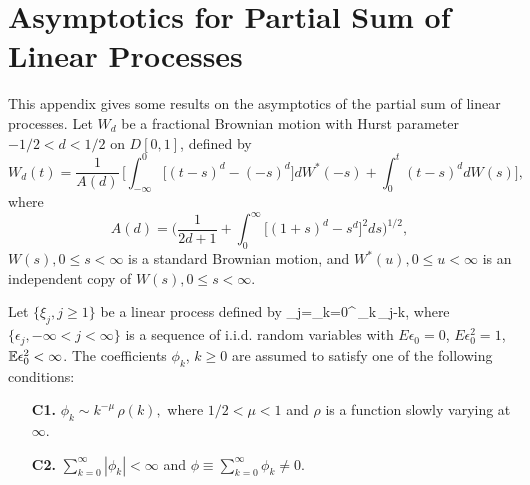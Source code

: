 \chapter{Asymptotics for Partial Sum of Linear Processes} 

This appendix gives some results on the asymptotics of the partial sum of linear processes. Let $W_{d }$  be a fractional Brownian motion with Hurst parameter $-1/2<d<1/2$ on $D[0,1]$, defined by
\begin{equation*}
W_{d}(t)=\frac{1}{A(d)}\,\big[ \int_{-\infty }^{0}\Big[(t-s)^{d}-(-s)^{d}\Big]dW^*(-s)+\int_{0}^{t}(t-s)^{d}dW(s)\big],
\end{equation*}%
where
\begin{equation*}
A(d)=\Big (\frac{1}{2d+1 }+\int_{0}^{\infty }\Big[(1+s)^{d}-s^{d}\Big]^{2}ds\Big)^{1/2},
\end{equation*}%
$W(s), 0\leq s<\infty $ is a standard Brownian motion, and
$W^{\ast }(u),0\leq u<\infty $ is an independent copy of $W(s), 0\leq s<\infty $.

Let $\{\xi_{j},j\geq 1\}$ be a linear process defined by
\bestar
\xi _{j}=\sum_{k=0}^{\infty }\,\phi _{k}\,\epsilon _{j-k},
\eestar
where $\{\epsilon _{j},-\infty <j<\infty \}$ is a sequence of i.i.d. random variables with $E\epsilon _{0}=0$, $E\epsilon _{0}^{2}=1$, $\mathbb E\epsilon_0^2 < \infty$. The coefficients $\phi_k$, $k \ge 0$ are assumed to satisfy one of the following conditions:
\begin{itemize}
\item[\textbf{C1.}] $\phi _{k}\sim k^{-\mu }\,\rho(k),$ where $1/2<\mu <1$ and $%
\rho$ is a function slowly varying at $\infty $.
\item[\textbf{C2.}] $\sum_{k=0}^{\infty } |\phi _{k}|<\infty $ and $\phi \equiv
\sum_{k=0}^{\infty }\phi_{k}\not =0$.
\end{itemize}




